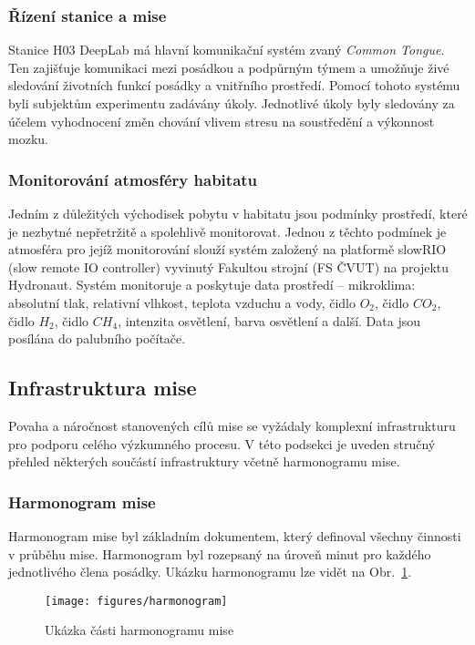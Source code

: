 \subsubsection{Řízení stanice a mise}
\label{subsubsec:rizeni_stanice_mise}
Stanice H03 DeepLab má hlavní komunikační systém zvaný \textit{Common Tongue}.
Ten zajišťuje komunikaci mezi posádkou a podpůrným týmem a umožňuje živé
sledování životních funkcí posádky a vnitřního prostředí. Pomocí tohoto systému
byli subjektům experimentu zadávány úkoly. Jednotlivé úkoly byly sledovány za
účelem vyhodnocení změn chování vlivem stresu na soustředění a výkonnost mozku.

\subsubsection{Monitorování atmosféry habitatu}
Jedním z důležitých východisek pobytu v habitatu jsou podmínky prostředí, které
je nezbytné nepřetržitě a spolehlivě monitorovat. Jednou z těchto podmínek je
atmosféra pro jejíž monitorování slouží systém založený na platformě slowRIO
(slow remote IO controller) vyvinutý Fakultou strojní (FS ČVUT) na projektu
Hydronaut. Systém monitoruje a poskytuje data prostředí -- mikroklima: absolutní
tlak, relativní vlhkost, teplota vzduchu a vody, čidlo $O_2$, čidlo $CO_2$,
čidlo $H_2$, čidlo $CH_4$, intenzita osvětlení, barva osvětlení a další. Data
jsou posílána do palubního počítače.

\subsection{Infrastruktura mise}
\label{subsec:infrastruktura_mise}
Povaha a náročnost stanovených cílů mise se vyžádaly komplexní infrastrukturu
pro podporu celého výzkumného procesu. V této podsekci je uveden stručný přehled
některých součástí infrastruktury včetně harmonogramu mise.

\subsubsection{Harmonogram mise}
\label{subsubsec:harmonogram_mise}
Harmonogram mise byl základním dokumentem, který definoval všechny činnosti v
průběhu mise. Harmonogram byl rozepsaný na úroveň minut pro každého jednotlivého
člena posádky. Ukázku harmonogramu lze vidět na Obr.~\ref{fig:harmonogram}.

\begin{figure}[h]
    \begin{center}
        \begin{framed}
            \texttt{[image: figures/harmonogram]}
        \end{framed}
        \caption{Ukázka části harmonogramu mise}
        \label{fig:harmonogram}
    \end{center}
\end{figure}

